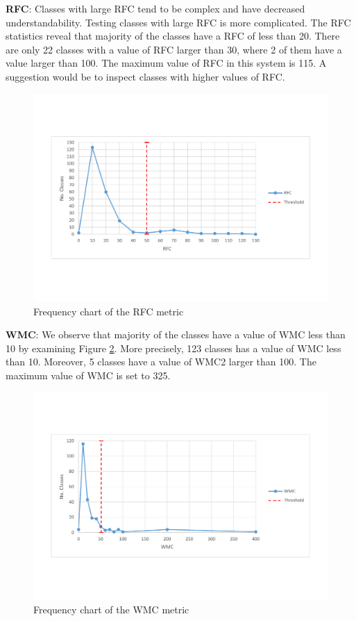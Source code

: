 \textbf{RFC}: Classes with large RFC tend to be complex and have decreased understandability. Testing classes with large RFC is more complicated. The RFC statistics reveal that majority of the classes have a RFC of less than 20. There are only 22 classes with a value of RFC larger than 30, where 2 of them have a value larger than 100. The maximum value of RFC in this system is 115. A suggestion would be to inspect classes with higher values of RFC.

\begin{figure}
	\centering
	\includegraphics[width=\textwidth]{images/threshold/rfc.pdf}
	\caption{Frequency chart of the RFC metric}
	\label{fig:rfcdistribution}
\end{figure}

\textbf{WMC}: We observe that majority of the classes have a value of WMC less than 10 by examining Figure \ref{fig:wmcdistribution}. More precisely, 123 classes has a value of WMC less than 10. Moreover, 5 classes have a value of WMC2 larger than 100. The maximum value of WMC is set to 325.

\begin{figure}
	\centering
	\includegraphics[width=\textwidth]{images/threshold/wmc.pdf}
	\caption{Frequency chart of the WMC metric}
	\label{fig:wmcdistribution}
\end{figure}

